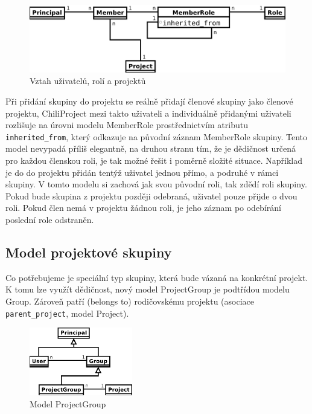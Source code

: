 \documentclass[thesis=B,czech]{FITthesis}[2012/05/02]
\begin{document}
\begin{figure}[htbp]
\centering
\includegraphics[width=1\textwidth]{group-er2.pdf}
\caption{Vztah uživatelů, rolí a projektů}
\end{figure}

Při přidání skupiny do projektu se reálně přidají členové skupiny jako
členové projektu, ChiliProject mezi takto  uživateli a
individuálně přidanými uživateli rozlišuje na úrovni modelu MemberRole
prostřednictvím atributu \lstinline!inherited_from!, který odkazuje na
původní záznam MemberRole skupiny. Tento model nevypadá příliš
elegantně, na druhou stranu tím, že je dědičnost určená pro každou
členskou roli, je tak možné řešit i poměrně složité situace. Například
je do do projektu přidán tentýž uživatel jednou přímo, a podruhé v rámci
skupiny. V tomto modelu si zachová jak svou původní roli, tak zdědí roli
skupiny. Pokud bude skupina z projektu později odebraná, uživatel pouze
přijde o dvou roli. Pokud člen nemá v projektu žádnou roli, je jeho
záznam po odebírání poslední role odstraněn.

\subsection{Model projektové skupiny}

Co potřebujeme je speciální typ skupiny, která bude vázaná na konkrétní
projekt. K tomu lze využít dědičnost, nový model ProjectGroup je
podtřídou modelu Group. Zároveň patří (belongs to) rodičovskému projektu
(asociace \lstinline!parent_project!, model Project).

\begin{figure}[bp]
\centering
\includegraphics[width=0.4\textwidth]{group-er3.pdf}
\caption{Model ProjectGroup}
\end{figure}
\end{document}
